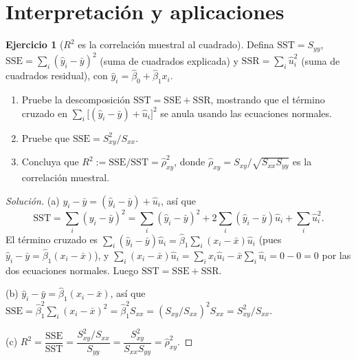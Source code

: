 \documentclass[11pt,a4paper,oneside]{article}
\theoremstyle{plain}
\theoremstyle{definition}
\newtheorem{exercise}[teorema]{Ejercicio}
\begin{document}
\section{Interpretación y aplicaciones}

\begin{exercise}[$R^2$ es la correlación muestral al cuadrado]\label{ej:r2-rho2}
Defina $\mathrm{SST}=S_{yy}$, $\mathrm{SSE}=\sum_i(\hat y_i-\bar y)^2$
(suma de cuadrados explicada) y $\mathrm{SSR}=\sum_i\hat u_i^2$ (suma de
cuadrados residual), con $\hat y_i=\hat\beta_0+\hat\beta_1x_i$.
\begin{enumerate}[nosep,leftmargin=1.8em,label=(\alph*)]
  \item Pruebe la descomposición $\mathrm{SST}=\mathrm{SSE}+\mathrm{SSR}$,
  mostrando que el término cruzado en
  $\sum_i\big[(\hat y_i-\bar y)+\hat u_i\big]^2$ se anula usando las
  ecuaciones normales.
  \item Pruebe que $\mathrm{SSE}=S_{xy}^2/S_{xx}$.
  \item Concluya que $R^2:=\mathrm{SSE}/\mathrm{SST} = \hat\rho_{xy}^2$,
  donde $\hat\rho_{xy}=S_{xy}/\sqrt{S_{xx}S_{yy}}$ es la correlación
  muestral.
\end{enumerate}
\end{exercise}
\begin{proof}[Solución]
(a) $y_i-\bar y = (\hat y_i-\bar y)+\hat u_i$, así que
\[
  \mathrm{SST}=\sum_i(y_i-\bar y)^2
  = \sum_i(\hat y_i-\bar y)^2 + 2\sum_i(\hat y_i-\bar y)\hat u_i + \sum_i\hat u_i^2.
\]
El término cruzado es
$\sum_i(\hat y_i-\bar y)\hat u_i = \hat\beta_1\sum_i(x_i-\bar x)\hat u_i$
(pues $\hat y_i-\bar y=\hat\beta_1(x_i-\bar x)$), y
$\sum_i(x_i-\bar x)\hat u_i = \sum_i x_i\hat u_i - \bar x\sum_i\hat u_i
= 0-0=0$ por las dos ecuaciones normales. Luego
$\mathrm{SST}=\mathrm{SSE}+\mathrm{SSR}$.

(b) $\hat y_i-\bar y=\hat\beta_1(x_i-\bar x)$, así que
$\mathrm{SSE}=\hat\beta_1^2\sum_i(x_i-\bar x)^2 = \hat\beta_1^2 S_{xx}
= (S_{xy}/S_{xx})^2 S_{xx} = S_{xy}^2/S_{xx}$.

(c) $R^2 = \dfrac{\mathrm{SSE}}{\mathrm{SST}}
= \dfrac{S_{xy}^2/S_{xx}}{S_{yy}} = \dfrac{S_{xy}^2}{S_{xx}S_{yy}}
= \hat\rho_{xy}^2$.
\end{proof}
\end{document}
